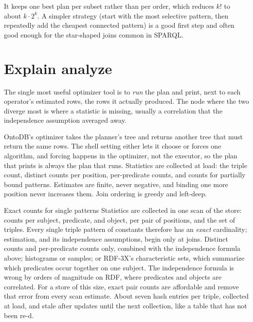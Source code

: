 It keeps one best plan per subset rather than per order, which reduces $k!$ to
about $k \cdot 2^k$. A simpler  strategy (start with the most
selective pattern, then repeatedly add the cheapest connected pattern) is a
good first step and often good enough for the star-shaped joins common in SPARQL.

\section{Explain analyze}

The single most useful optimizer tool is to \emph{run} the plan and print, next
to each operator's estimated rows, the rows it actually produced. The node where
the two diverge most is where a statistic is missing, usually a correlation that
the independence assumption averaged away.

\begin{ontodb}
OntoDB's optimizer takes the planner's tree and returns another tree that must
return the same rows. The shell setting  either lets it choose or forces one algorithm, and forcing
happens in the optimizer, not the executor, so the plan that
 prints is always the plan that runs. Statistics
are collected at load: the triple count, distinct counts per position,
per-predicate counts, and counts for partially bound patterns. Estimates are
finite, never negative, and binding one more position never increases them.
Join ordering is greedy and left-deep.
\end{ontodb}

\begin{decision}{Exact counts for single patterns}
 Statistics are collected in one scan of the store: counts per
subject, predicate, and object, per pair of positions, and the set of triples.
Every single triple pattern of constants therefore has an \emph{exact}
cardinality; estimation, and its independence assumptions, begin only at joins.
 Distinct counts and per-predicate counts only, combined
with the independence formula above; histograms or samples; or RDF-3X's
characteristic sets, which summarize which predicates occur together on one
subject.
 The independence formula is wrong by orders of magnitude on RDF,
where predicates and objects are correlated. For a store of this size, exact
pair counts are affordable and remove that error from every scan estimate.
 About seven hash entries per triple, collected at load, and
stale after updates until the next collection, like a table that has not been
re-d.
\end{decision}

